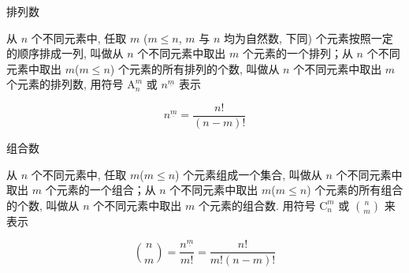 \begin{frame}[fragile]{排列数}
	\begin{definition}[排列数]
		\label{cbasic:def:pnum}
		从 \(n\) 个不同元素中, 任取 \(m\) (\(m\leq n\), \(m\) 与 \(n\) 均为自然数, 下同) 个元素按照一定的顺序排成一列, 叫做从 \(n\) 个不同元素中取出 \(m\) 个元素的一个排列；从 \(n\) 个不同元素中取出 \(m\)(\(m\leq n\)) 个元素的所有排列的个数, 叫做从 \(n\) 个不同元素中取出 \(m\) 个元素的排列数, 用符号 \(\mathrm A_n^m\) 或 \(n^{\underline{m}}\) 表示

		\begin{equation}
			\label{cbasic:eq:pnum}
			n^{\underline{m}} = \frac{n!}{(n - m)!}
		\end{equation}
	\end{definition}
\end{frame}


\begin{frame}[fragile]{组合数}
	\begin{definition}[组合数]
		\label{cbasic:def:cnum}
		从 \(n\) 个不同元素中, 任取 \(m\)(\(m\leq n\)) 个元素组成一个集合, 叫做从 \(n\) 个不同元素中取出 \(m\) 个元素的一个组合；从 \(n\) 个不同元素中取出 \(m\)(\(m\leq n\)) 个元素的所有组合的个数, 叫做从 \(n\) 个不同元素中取出 \(m\) 个元素的组合数. 用符号 \(\mathrm C_n^m\) 或 \(\binom{n}{m}\) 来表示

		\begin{equation}
			\label{cbasic:eq:cnum}
			\binom{n}{m} = \frac{n^{\underline{m}}}{m!} = \frac{n!}{m!(n - m)!}
		\end{equation}
	\end{definition}
\end{frame}


